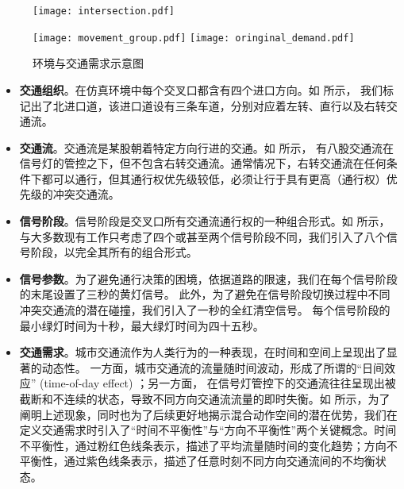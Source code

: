 \begin{figure}[ht]
    \centering
    \begin{minipage}[b]{.49\textwidth}
        \centering
        \texttt{[image: intersection.pdf]}
        \label{fig:intersection}
    \end{minipage}
    \hfill %
    \begin{minipage}[b]{.5\textwidth}
    \centering
        \texttt{[image: movement\_group.pdf]}
        \label{fig:movement-groups}
        \texttt{[image: oringinal\_demand.pdf]}
        \label{fig:urban-traffic-demand}
    \end{minipage}
\caption{环境与交通需求示意图}
\label{fig:traffic-environment}    
\end{figure}

\begin{itemize}[leftmargin=*]
    \setlength{\itemsep}{0pt}
    \setlength{\parsep}{0pt}
    \setlength{\parskip}{0pt}

    
    \item \textbf{交通组织}。在仿真环境中每个交叉口都含有四个进口方向。如 所示，
    我们标记出了北进口道，该进口道设有三条车道，分别对应着左转、直行以及右转交通流。
    \item \textbf{交通流}。交通流是某股朝着特定方向行进的交通。如 所示，
    有八股交通流在信号灯的管控之下，但不包含右转交通流。通常情况下，右转交通流在任何条件下都可以通行，但其通行权优先级较低，必须让行于具有更高（通行权）优先级的冲突交通流。
    \item \textbf{信号阶段}。信号阶段是交叉口所有交通流通行权的一种组合形式。如 所示，
    与大多数现有工作只考虑了四个或甚至两个信号阶段不同，我们引入了八个信号阶段，以完全其所有的组合形式。
    \item \textbf{信号参数}。为了避免通行决策的困境，依据道路的限速，我们在每个信号阶段的末尾设置了三秒的黄灯信号。
    此外，为了避免在信号阶段切换过程中不同冲突交通流的潜在碰撞，我们引入了一秒的全红清空信号。
    每个信号阶段的最小绿灯时间为十秒，最大绿灯时间为四十五秒。
    \item \textbf{交通需求}。城市交通流作为人类行为的一种表现，在时间和空间上呈现出了显著的动态性。
    一方面，城市交通流的流量随时间波动，形成了所谓的“日间效应” (time-of-day effect) ；另一方面，
    在信号灯管控下的交通流往往呈现出被截断和不连续的状态，导致不同方向交通流流量的即时失衡。如 所示，为了阐明上述现象，同时也为了后续更好地揭示混合动作空间的潜在优势，我们在定义交通需求时引入了“时间不平衡性”与“方向不平衡性”两个关键概念。时间不平衡性，通过粉红色线条表示，描述了平均流量随时间的变化趋势；方向不平衡性，通过紫色线条表示，描述了任意时刻不同方向交通流间的不均衡状态。
\end{itemize}
